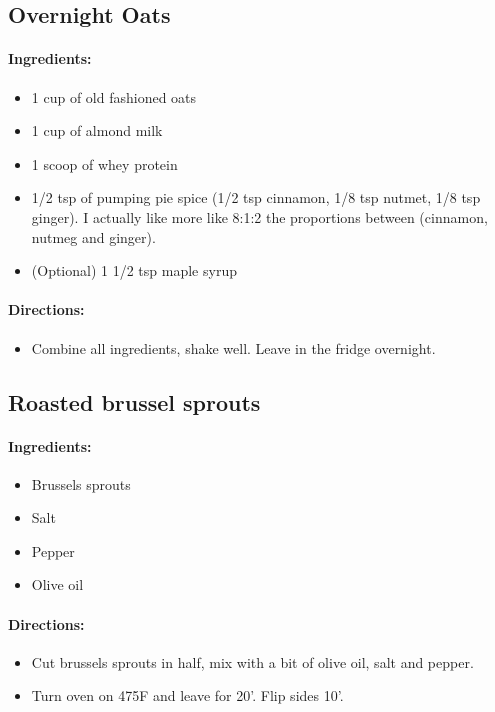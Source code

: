 \documentclass{article}
\begin{document}
\subsection{Overnight Oats}

\paragraph{Ingredients:}
\begin{itemize}
    \item 1 cup of old fashioned oats
    \item 1 cup of almond milk
    \item 1 scoop of whey protein
    \item 1/2 tsp of pumping pie spice (1/2 tsp cinnamon, 1/8 tsp nutmet, 1/8 tsp ginger). I actually like more like 8:1:2 the proportions between (cinnamon, nutmeg and ginger).
    \item (Optional) 1 1/2 tsp maple syrup
\end{itemize}

\paragraph{Directions:}
\begin{itemize}
    \item Combine all ingredients, shake well. Leave in the fridge overnight.
\end{itemize}

\subsection{Roasted brussel sprouts}

\paragraph{Ingredients:}
\begin{itemize}
    \item Brussels sprouts
    \item Salt
    \item Pepper
    \item Olive oil
\end{itemize}

\paragraph{Directions:}
\begin{itemize}
    \item Cut brussels sprouts in half, mix with a bit of olive oil, salt and pepper.
    \item Turn oven on 475F and leave for 20'. Flip sides 10'.
\end{itemize}
\end{document}
